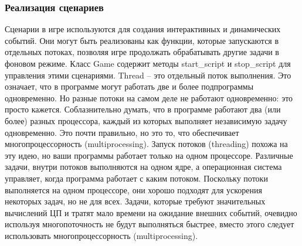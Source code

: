 \subsubsection{Реализация сценариев}
Сценарии в игре используются для создания интерактивных и динамических событий. Они могут быть реализованы как функции, которые запускаются в отдельных потоках, позволяя игре продолжать обрабатывать другие задачи в фоновом режиме. Класс Game содержит методы start\_script и stop\_script для управления этими сценариями. Thread – это отдельный поток выполнения. Это означает, что в программе могут работать две и более подпрограммы одновременно. Но разные потоки на самом деле не работают одновременно: это просто кажется.
Соблазнительно думать, что в программе работают два (или более) разных процессора, каждый из которых выполняет независимую задачу одновременно. Это почти правильно, но это то, что обеспечивает многопроцессорность (multiprocessing).
Запуск потоков (threading) похожа на эту идею, но ваши программы работает только на одном процессоре. Различные задачи, внутри потоков выполняются на одном ядре, а операционная система управляет, когда программа работает с каким потоком.
Поскольку потоки выполняется на одном процессоре, они хорошо подходят для ускорения некоторых задач, но не для всех. Задачи, которые требуют значительных вычислений ЦП и тратят мало времени на ожидание внешних событий, очевидно используя многопоточность не будут выполняться быстрее, вместо этого следует использовать многопроцессорность (multiprocessing).

